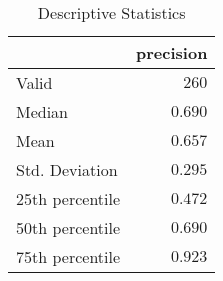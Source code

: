 \begin{table}[ht]
  \scriptsize
  \centering
  \caption{\footnotesize Descriptive Statistics}
  \label{table:t2}
  \begin{tabular}{lr}
    \hline
			 & precision  \\
    \hline
			Valid & $260$  \\
			Median & $0.690$  \\
			Mean & $0.657$  \\
			Std. Deviation & $0.295$  \\
			25th percentile & $0.472$  \\
			50th percentile & $0.690$  \\
			75th percentile & $0.923$  \\
    \hline
  \end{tabular}
\end{table}
